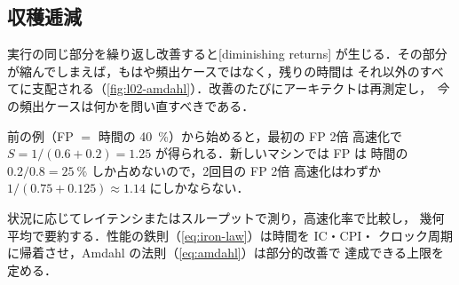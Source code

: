 \documentclass[../main.tex]{subfiles}
\begin{document}
\subsection{収穫逓減}

実行の同じ部分を繰り返し改善すると[diminishing returns]
が生じる．その部分が縮んでしまえば，もはや頻出ケースではなく，残りの時間は
それ以外のすべてに支配される（\cref{fig:l02-amdahl}）．改善のたびにアーキテクトは再測定し，
\emph{今}の頻出ケースは何かを問い直すべきである．

\begin{example}
  前の例（FP $=$ 時間の \SI{40}{\percent}）から始めると，最初の FP 2倍
  高速化で $S = 1/(0.6+0.2) = 1.25$ が得られる．新しいマシンでは FP は
  時間の $0.2/0.8 = \SI{25}{\percent}$ しか占めないので，2回目の FP 2倍
  高速化はわずか $1/(0.75+0.125) \approx 1.14$ にしかならない．
\end{example}

\begin{keypoint}[章のまとめ]
  状況に応じてレイテンシまたはスループットで測り，高速化率で比較し，
  幾何平均で要約する．性能の鉄則（\cref{eq:iron-law}）は時間を IC・CPI・
  クロック周期に帰着させ，Amdahl の法則（\cref{eq:amdahl}）は部分的改善で
  達成できる上限を定める．
\end{keypoint}

\begin{marginfigure}
  \resizebox{\linewidth}{!}{}
  \caption{$f_{\mathrm{enh}} = 0.4$ のときの全体の高速化率 $S$．改善部分が
    速くなるほど，同じ部分をさらに改善して得られる効果は小さくなる．}
  \label{fig:l02-amdahl}
\end{marginfigure}
\end{document}
